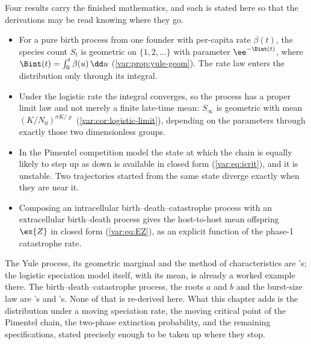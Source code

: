 Four results carry the finished mathematics, and each is stated here so that
the derivations may be read knowing where they go.

\begin{itemize}[leftmargin=1.6em,itemsep=0.35em,topsep=0.35em]
\item For a pure birth process from one founder with per-capita rate
$\beta(t)$, the species count $S_t$ is geometric on $\{1,2,\dots\}$ with
parameter $\ee^{-\Bint(t)}$, where
$\Bint(t)=\int_0^t\beta(u)\,\dd u$
(\cref{var:prop:yule-geom}). The rate law enters the distribution only
through its integral.
\item Under the logistic rate the integral converges, so the process has a
proper limit law and not merely a finite late-time mean: $S_\infty$ is
geometric with mean $(K/N_0)^{\sigma K/\varrho}$
(\cref{var:cor:logistic-limit}), depending on the parameters through exactly
those two dimensionless groups.
\item In the Pimentel competition model the state at which the chain is
equally likely to step up as down is available in closed form
(\cref{var:eq:icrit}), and it is unstable. Two trajectories started from the
same state diverge exactly when they are near it.
\item Composing an intracellular birth--death--catastrophe process with an
extracellular birth--death process gives the host-to-host mean offspring
$\ex{Z}$ in closed form (\cref{var:eq:EZ}), as an explicit function of the
phase-1 catastrophe rate.
\end{itemize}

The Yule process, its geometric marginal and the method of characteristics
are \ChM{}'s; the logistic speciation model itself, with its mean, is already
a worked example there. The birth--death--catastrophe process, the roots $a$
and $b$ and the burst-size law are \ChCore{}'s and \ChDist{}'s. None of that
is re-derived here. What this chapter adds is the distribution under a moving
speciation rate, the moving critical point of the Pimentel chain, the
two-phase extinction probability, and the remaining specifications, stated
precisely enough to be taken up where they stop.

